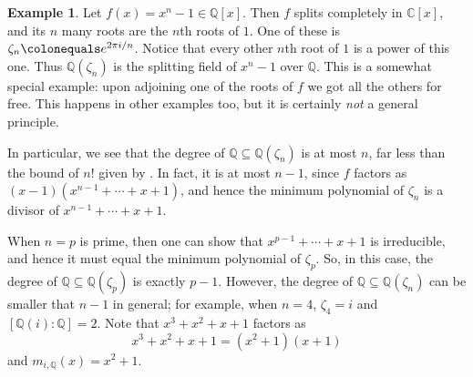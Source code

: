 \documentclass[12pt]{report}
\numberwithin{equation}{section}
\numberwithin{theorem}{chapter}
\theoremstyle{definition}
\newtheorem{example}[theorem]{Example}
\newtheorem*{basic properties}{Basic Properties}
\newtheorem*{Important Remark}{Important Remark}
\newcommand{\df}[1]{{\bf #1}\index{#1}}
\newcommand{\C}{\mathbb{C}}
\begin{document}
\begin{example} 
Let $f(x) = x^n -1 \in \mathbb{Q}[x]$. Then $f$ splits completely in
  $\C[x]$, and its $n$ many roots are the $n$th roots of $1$. One of these
  is $\zeta_n \colonequals e^{2 \pi i/n}$. Notice that every other $n$th root of $1$ is a power of this one. 
Thus $\mathbb{Q}(\zeta_n)$ is the splitting field of $x^n-1$ over $\mathbb{Q}$. 
This is a somewhat special example: upon adjoining one of the roots of $f$ we got all the others for free. This happens in other examples too, but it is certainly {\em not} a general principle.


In particular, we see that the degree of $\mathbb{Q} \subseteq \mathbb{Q}(\zeta_n)$ is at most $n$, far less than the bound of $n!$ given by .
In fact, it is at most $n-1$, since $f$ factors as $(x-1)(x^{n-1} + \cdots + x + 1)$, and hence the minimum polynomial of $\zeta_n$ is a divisor of $x^{n-1} + \cdots + x + 1$. 

When $n = p$ is prime, then one can show that $x^{p-1} + \cdots + x + 1$ is irreducible, and hence it must equal the minimum polynomial of $\zeta_p$. So, in this case, the degree of $\mathbb{Q} \subseteq \mathbb{Q}(\zeta_p)$ is exactly $p-1$.
However, the degree of $\mathbb{Q} \subseteq \mathbb{Q}(\zeta_n)$ can be smaller that $n-1$ in general; for example, when $n = 4$, $\zeta_4  = i$ and $[\mathbb{Q}(i): \mathbb{Q}] = 2$. Note that $x^3 + x^2 + x + 1$ factors as 
$$x^3 + x^2 + x + 1 = (x^2+1)(x+1)$$
and $m_{i, \mathbb{Q}}(x) = x^2 + 1$.
\end{example}
\end{document}

